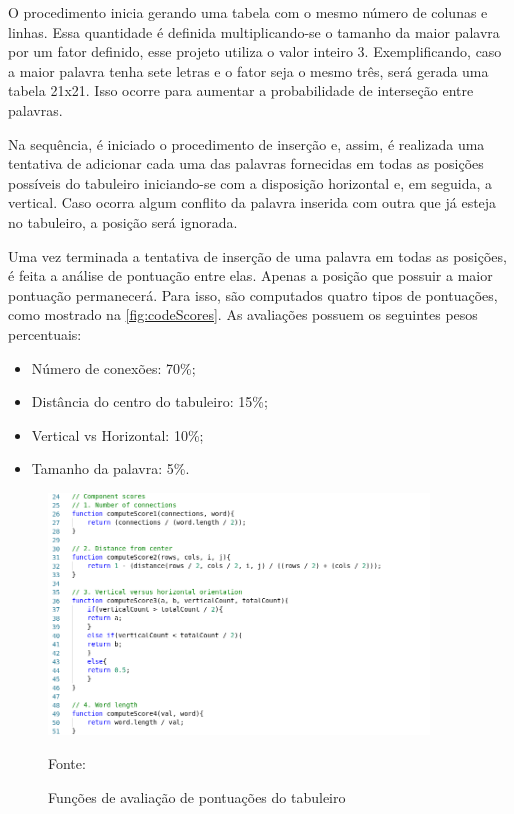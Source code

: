 O procedimento inicia gerando uma tabela com o mesmo número de colunas e linhas. Essa quantidade é definida multiplicando-se o tamanho da maior palavra por um fator definido, esse projeto utiliza o valor inteiro 3. Exemplificando, caso a maior palavra tenha sete letras e o fator seja o mesmo três, será gerada uma tabela 21x21. Isso ocorre para aumentar a probabilidade de interseção entre palavras. 

Na sequência, é iniciado o procedimento de inserção e, assim, é realizada uma tentativa de adicionar cada uma das palavras fornecidas em todas as posições possíveis do tabuleiro iniciando-se com a disposição horizontal e, em seguida, a vertical. Caso ocorra algum conflito da palavra inserida com outra que já esteja no tabuleiro, a posição será ignorada. 

Uma vez terminada a tentativa de inserção de uma palavra em todas as posições, é feita a análise de pontuação entre elas. Apenas a posição que possuir a maior pontuação permanecerá. Para isso, são computados quatro tipos de pontuações, como mostrado na \autoref{fig:codeScores}. As avaliações possuem os seguintes pesos percentuais:

\begin{itemize}
    \item Número de conexões: 70\%;
    \item Distância do centro do tabuleiro: 15\%;
    \item Vertical vs Horizontal: 10\%;
    \item Tamanho da palavra: 5\%.
\end{itemize}

\begin{figure}[H]
\centering
    \caption{Funções de avaliação de pontuações do tabuleiro}
    \label{fig:codeScores}
    \includegraphics[width=0.9\textwidth]{Figuras/codeComponentScores.png}
    
    Fonte: \cite{layoutGenerator}
\end{figure}

